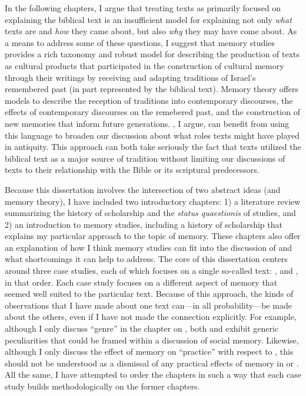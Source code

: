 In the following chapters, I argue that treating \rwb texts as primarily focused on explaining the biblical text is an insufficient model for explaining not only \emph{what} \rwb texts are and \emph{how} they came about, but also \emph{why} they may have come about. As a means to address some of these questions, I suggest that memory studies provides a rich taxonomy and robust model for describing the production of \rwb texts as cultural products that participated in the construction of cultural memory through their writings by receiving and adapting traditions of Israel's remembered past (in part represented by the biblical text). Memory theory offers models to describe the reception of traditions into contemporary discourses, the effects of contemporary discourses on the remebered past, and the construction of new memories that inform future generations. \rwb, I argue, can benefit from using this language to broaden our discussion about what roles \rwb texts might have played in antiquity. This approach can both take seriously the fact that \rwb texts utilized the biblical text as a major source of tradition without limiting our discussions of \rwb texts to their relationship with the Bible or its scriptural predecessors.



Because this dissertation involves the intersection of two abstract ideas (\rwb and memory theory), I have included two introductory chapters: 1) a literature review summarizing the history of scholarship and the \emph{status quaestionis} of \rwb studies, and 2) an introduction to memory studies, including a history of scholarship that explains my particular approach to the topic of memory. These chapters also offer an explanation of how I think memory studies can fit into the discussion of \rwb and what shortcomings it can help to address. The core of this dissertation centers around three case studies, each of which focuses on a single so-called \rwb text: \chronicles, \ga and \jub, in that order. Each case study focuses on a different aspect of memory that seemed well suited to the particular text. Because of this approach, the kinds of observations that I have made about one text can---in all probability---be made about the others, even if I have not made the connection explicitly. For example, although I only discuss ``genre'' in the chapter on \ga, both \chronicles and \jub exhibit generic peculiarities that could be framed within a discussion of social memory. Likewise, although I only discuss the effect of memory on ``practice'' with respect to \jub, this should not be understood as a dismissal of any practical effects of memory in \chronicles or \ga. All the same, I have attempted to order the chapters in such a way that each case study builds methodologically on the former chapters.

